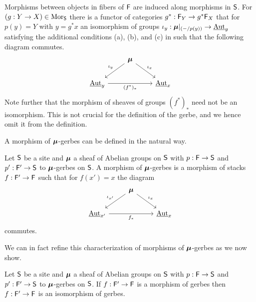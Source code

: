 \begin{remark}
    Morphisms between objects in fibers of $\mathsf{F}$ are induced along morphisms in $\mathsf{S}$. For $(g:Y\to X)\in\mathrm{Mor}_{\mathsf{S}}$ there is a functor of categories $g^{*}:\mathsf{F}_{Y}\to g^{*}\mathsf{F}_{X}$ that for $p(y)=Y$ with $y=g^{*}x$ an isomorphism of groups $\iota_{y}:\bm{\mu}|_{(-/p(y))}\to\operatorname{\underline{\mathrm{Aut}}}_{y}$ satisfying the additional conditions (a), (b), and (c) in  such that the following diagram commutes. 
    $$%
    \begin{tikzcd}
        & \Bmu \\
        {\ulAut_{y}} && {\ulAut_{x}}
        \arrow["{\iota_{x}}", from=1-2, to=2-3]
        \arrow["{\iota_{y}}"', from=1-2, to=2-1]
        \arrow["{(f^{*})_{*}}"', from=2-1, to=2-3]
    \end{tikzcd}$$
    Note further that the morphism of sheaves of groups $(f^{*})_{*}$ need not be an isomorphism. This is not crucial for the definition of the gerbe, and we hence omit it from the definition. 
\end{remark}
A morphism of $\bm{\mu}$-gerbes can be defined in the natural way. 
\newpage
\begin{definition}\label{def: morphism of gerbes}
    Let $\mathsf{S}$ be a site and $\bm{\mu}$ a sheaf of Abelian groups on $\mathsf{S}$ with $p:\mathsf{F}\to\mathsf{S}$ and $p':\mathsf{F}'\to\mathsf{S}$ to $\bm{\mu}$-gerbes on $\mathsf{S}$. A morphism of $\bm{\mu}$-gerbes is a morphism of stacks $f:\mathsf{F}'\to\mathsf{F}$ such that for $f(x')=x$ the diagram 
    $$%
    \begin{tikzcd}
        & \Bmu \\
        {\ulAut_{x'}} && {\ulAut_{x}}
        \arrow["{f_{*}}"', from=2-1, to=2-3]
        \arrow["{\iota_{x}}", from=1-2, to=2-3]
        \arrow["{\iota_{x'}}"', from=1-2, to=2-1]
    \end{tikzcd}$$
    commutes. 
\end{definition}
We can in fact refine this characterization of morphisms of $\bm{\mu}$-gerbes as we now show. 
\begin{proposition}\label{prop: a morphism of gerbes is an isomorphism}
    Let $\mathsf{S}$ be a site and $\bm{\mu}$ a sheaf of Abelian groups on $\mathsf{S}$ with $p:\mathsf{F}\to\mathsf{S}$ and $p':\mathsf{F}'\to\mathsf{S}$ to $\bm{\mu}$-gerbes on $\mathsf{S}$. If $f:\mathsf{F}'\to\mathsf{F}$ is a morphism of gerbes then $f:\mathsf{F}'\to\mathsf{F}$ is an isomorphism of gerbes. 
\end{proposition}
